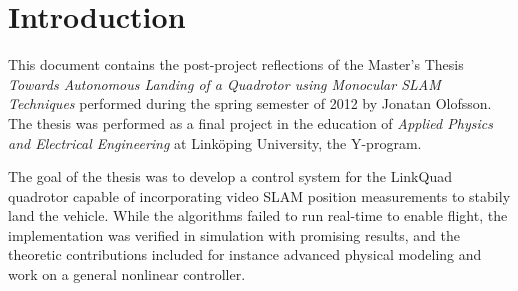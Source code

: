 \section{Introduction}
	\label{sec:introduction}
	This document contains the post-project reflections of the Master's Thesis
	\textit{Towards Autonomous Landing of a Quadrotor using Monocular SLAM Techniques}
	performed during the spring semester of 2012 by Jonatan Olofsson.
	The thesis was performed as a final project in the education of
	\textit{Applied Physics and Electrical Engineering} at Linköping University, the Y-program.

	The goal of the thesis was to develop a control system for the LinkQuad quadrotor
	capable of incorporating video SLAM position measurements to stabily land the vehicle.
	While the algorithms failed to run real-time to enable flight, the
	implementation was verified in simulation with promising results,
	and the theoretic contributions included for instance advanced physical modeling and
	work on a general nonlinear controller.

